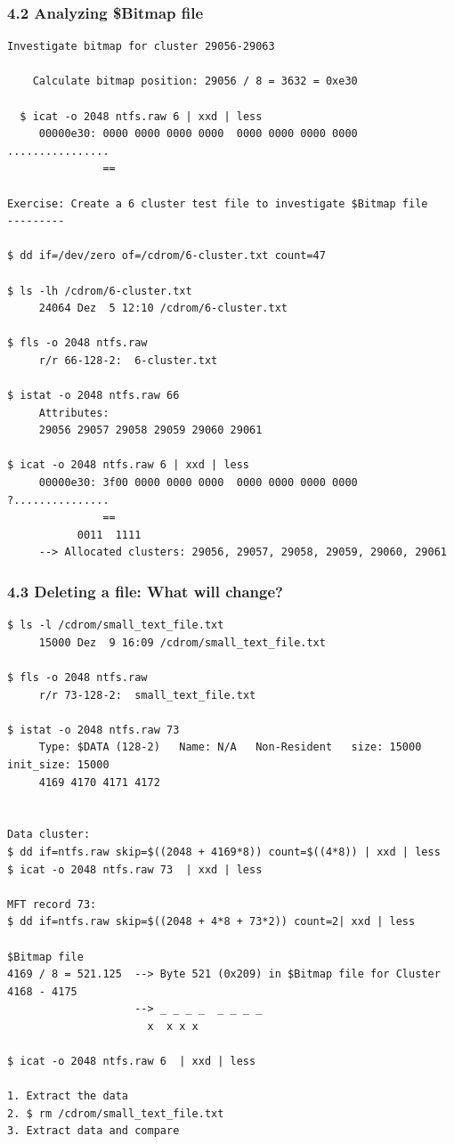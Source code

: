 \begin{frame}[fragile]
  \frametitle{4.2 Analyzing \$Bitmap file}
  \begin{lstlisting}[basicstyle=\tiny]
Investigate bitmap for cluster 29056-29063

    Calculate bitmap position: 29056 / 8 = 3632 = 0xe30
  
  $ icat -o 2048 ntfs.raw 6 | xxd | less
     00000e30: 0000 0000 0000 0000  0000 0000 0000 0000  ................
               ==

Exercise: Create a 6 cluster test file to investigate $Bitmap file
---------

$ dd if=/dev/zero of=/cdrom/6-cluster.txt count=47

$ ls -lh /cdrom/6-cluster.txt 
     24064 Dez  5 12:10 /cdrom/6-cluster.txt

$ fls -o 2048 ntfs.raw
     r/r 66-128-2:	6-cluster.txt

$ istat -o 2048 ntfs.raw 66
     Attributes: 
     29056 29057 29058 29059 29060 29061

$ icat -o 2048 ntfs.raw 6 | xxd | less
     00000e30: 3f00 0000 0000 0000  0000 0000 0000 0000  ?...............
               ==
           0011  1111
     --> Allocated clusters: 29056, 29057, 29058, 29059, 29060, 29061
  \end{lstlisting}
\end{frame}


\begin{frame}[fragile]
  \frametitle{4.3 Deleting a file: What will change?}
  \begin{lstlisting}[basicstyle=\tiny]
$ ls -l /cdrom/small_text_file.txt 
     15000 Dez  9 16:09 /cdrom/small_text_file.txt
  
$ fls -o 2048 ntfs.raw 
     r/r 73-128-2:	small_text_file.txt

$ istat -o 2048 ntfs.raw 73
     Type: $DATA (128-2)   Name: N/A   Non-Resident   size: 15000  init_size: 15000
     4169 4170 4171 4172
  

Data cluster:
$ dd if=ntfs.raw skip=$((2048 + 4169*8)) count=$((4*8)) | xxd | less
$ icat -o 2048 ntfs.raw 73  | xxd | less
  
MFT record 73: 
$ dd if=ntfs.raw skip=$((2048 + 4*8 + 73*2)) count=2| xxd | less

$Bitmap file
4169 / 8 = 521.125  --> Byte 521 (0x209) in $Bitmap file for Cluster 4168 - 4175
                    --> _ _ _ _  _ _ _ _
		              x  x x x   

$ icat -o 2048 ntfs.raw 6  | xxd | less

1. Extract the data
2. $ rm /cdrom/small_text_file.txt
3. Extract data and compare
  \end{lstlisting}
\end{frame}


